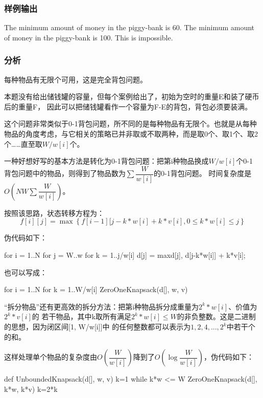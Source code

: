 \subsubsection{样例输出}
\begin{Code}
The minimum amount of money in the piggy-bank is 60.
The minimum amount of money in the piggy-bank is 100.
This is impossible.
\end{Code}

\subsubsection{分析}
每种物品有无限个可用，这是完全背包问题。

本题没有给出储钱罐的容量，但每个案例给出了，初始为空时的重量E和装了硬币后的重量F，
因此可以把储钱罐看作一个容量为F-E的背包，背包必须要装满。

这个问题非常类似于0-1背包问题，所不同的是每种物品有无限个。也就是从每种
物品的角度考虑，与它相关的策略已并非取或不取两种，而是取0个、取1个、取2
个……直至取$W/w[i]$个。

一种好想好写的基本方法是转化为0-1背包问题：把第i种物品换成$W/w[i]$个0-1
背包问题中的物品，则得到了物品数为$\sum \dfrac{W}{w[i]}$的0-1背包问题。
时间复杂度是$O(NW\sum \dfrac{W}{w[i]})$。

按照该思路，状态转移方程为：
$$f[i][j]=\max\left\{f[i-1][j-k*w[i]+k*v[i], 0 \leq k*w[i] \leq j\right\}$$

伪代码如下：
\begin{Code}
for i = 1..N
    for j = W..w
        for k = 1..j/w[i]
            d[j] = max{d[j], d[j-k*w[i]] + k*v[i]};
\end{Code}

也可以写成：
\begin{Code}
for i = 1..N
    for k = 1..W/w[i]
        ZeroOneKnapsack(d[], w, v)
\end{Code}

“拆分物品”还有更高效的拆分方法：把第i种物品拆分成重量为$2^k*w[i]$、价值为$2^k*v[i]$的
若干物品，其中k取所有满足$2^k*w[i] \leq W$的非负整数。这是二进制的思想，因为闭区间[1, W/w[i]]中
的任何整数都可以表示为$1, 2, 4, ..., 2^k$中若干个的和。

这样处理单个物品的复杂度由$O\left(\dfrac{W}{w[i]}\right)$降到了$O\left(\log \dfrac{W}{w[i]}\right)$，伪代码如下：
\begin{Code}
def UnboundedKnapsack(d[], w, v)
    k=1
    while k*w <= W
        ZeroOneKnapsack(d[], k*w, k*v)
        k=2*k
\end{Code}

